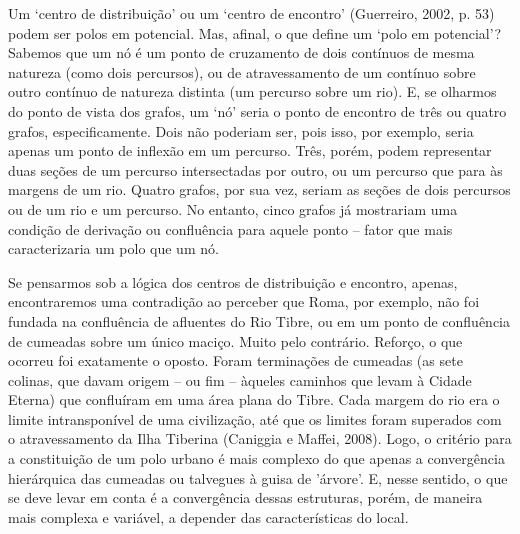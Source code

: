 \documentclass[]{report}
\begin{document}
Um `centro de distribuição' ou um `centro de encontro' (Guerreiro, 2002, p. 53) podem ser polos em potencial. Mas, afinal, o que define um `polo em potencial'? Sabemos que um nó é um ponto de cruzamento de dois contínuos de mesma natureza (como dois percursos), ou de atravessamento de um contínuo sobre outro contínuo de natureza distinta (um percurso sobre um rio). E, se olharmos do ponto de vista dos grafos, um `nó' seria o ponto de encontro de três ou quatro grafos, especificamente. Dois não poderiam ser, pois isso, por exemplo, seria apenas um ponto de inflexão em um percurso. Três, porém, podem representar duas seções de um percurso intersectadas por outro, ou um percurso que para às margens de um rio. Quatro grafos, por sua vez, seriam as seções de dois percursos ou de um rio e um percurso. No entanto, cinco grafos já mostrariam uma condição de derivação ou confluência para aquele ponto – fator que mais caracterizaria um polo que um nó.

Se pensarmos sob a lógica dos centros de distribuição e encontro, apenas, encontraremos uma contradição ao perceber que Roma, por exemplo, não foi fundada na confluência de afluentes do Rio Tibre, ou em um ponto de confluência de cumeadas sobre um único maciço. Muito pelo contrário. Reforço, o que ocorreu foi exatamente o oposto. Foram terminações de cumeadas (as sete colinas, que davam origem – ou fim – àqueles caminhos que levam à Cidade Eterna) que confluíram em uma área plana do Tibre. Cada margem do rio era o limite intransponível de uma civilização, até que os limites foram superados com o atravessamento da Ilha Tiberina (Caniggia e Maffei, 2008). Logo, o critério para a constituição de um polo urbano é mais complexo do que apenas a convergência hierárquica das cumeadas ou talvegues à guisa de 'árvore'. E, nesse sentido, o que se deve levar em conta é a convergência dessas estruturas, porém, de maneira mais complexa e variável, a depender das características do local.
\end{document}
